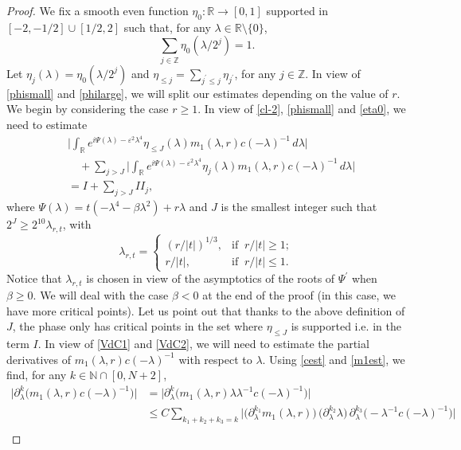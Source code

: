\documentclass[10pt,leqno]{amsart}
\numberwithin{equation}{section}
\newcommand{\field}[1]{\mathbb{#1}}
\newcommand{\N}{\field{N}}          		%
\newcommand{\Z}{\field{Z}}          		%
\newcommand{\R}{\field{R}}          		%
\begin{document}
\begin{proof}
We fix a smooth even function $\eta_0 : \R \rightarrow [0,1]$ supported in $[-2,-1/2] \cup [1/2 ,2]$ such that, for any $\lambda \in \R \setminus \{0\}$,
\begin{equation}
\label{eta0}
\sum_{j\in \Z} \eta_0 (\lambda /2^j)=1.
\end{equation}
Let $\eta_j (\lambda )= \eta_0 (\lambda /2^j)$ and $\eta_{\leq j}= \sum_{j^\prime \leq j} \eta_{j^\prime}$, for any $j\in \Z$. In view of \eqref{phismall} and \eqref{philarge}, we will split our estimates depending on the value of $r$.\\
 We begin by considering the case $r\geq 1$. In view of \eqref{cl-2}, \eqref{phismall} and \eqref{eta0}, we need to estimate
 \begin{align*}
&\Big|\int_{\R} e^{i\Psi (\lambda ) -\varepsilon^2 \lambda^4 } \eta_{\leq J}(\lambda)m_1 (\lambda ,r) c(-\lambda)^{-1}\,d\lambda \Big| \\
&\quad +\sum_{j>J}\Big|\int_{\R} e^{i\Psi (\lambda ) -\varepsilon^2 \lambda^4 } \eta_{j}(\lambda)m_1 (\lambda ,r) c(-\lambda)^{-1}\,d\lambda\Big| \\
& = I+\sum_{j>J}II_j,  
\end{align*}
where $\Psi(\lambda)= t (-\lambda^4 -\beta\lambda^2) +r\lambda$ and $J$ is the smallest integer such that $2^J \geq 2^{10}\lambda_{r,t}$, with 
$$\lambda_{r,t}=\begin{cases} (r/|t|)^{1/3},&\mbox{if }\  r/|t| \geq 1 ;\\ 
r/|t|,&\mbox{if }\  r/|t| \leq 1. \end{cases}$$
Notice that $\lambda_{r,t}$ is chosen in view of the asymptotics of the roots of $\Psi^\prime$ when $\beta\geq 0$. We will deal with the case $\beta <0$ at the end of the proof (in this case, we have more critical points). Let us point out that thanks to the above definition of $J$, the phase only has critical points in the set where $\eta_{\leq J}$ is supported i.e. in the term $I$. In view of \eqref{VdC1} and \eqref{VdC2}, we will need to estimate the partial derivatives  of $m_1 (\lambda ,r) c(-\lambda)^{-1}$ with respect to $\lambda$. Using \eqref{cest} and \eqref{m1est}, we find, for any $k\in \N \cap [0,N+2]$,
\begin{align}
\label{estder}
\big|\partial_{\lambda}^{k}\big(m_1 (\lambda ,r) c(-\lambda)^{-1}\big)\big| & = \big|\partial_{\lambda}^{k}\big(m_1 (\lambda ,r)\lambda\lambda^{-1} c(-\lambda)^{-1}\big)\big|\nonumber\\
&\leq C \sum_{k_1 +k_2 +k_3 =k} 
\big|\big(\partial_{\lambda}^{k_1}m_1(\lambda,r)\big)\,\big(\partial_{\lambda}^{k_2}\lambda\big)\, \partial_{\lambda}^{k_3}\big(-\lambda^{-1} c(-\lambda)^{-1}\big)\big|\nonumber\\

\end{align}
\end{proof}
\end{document}
